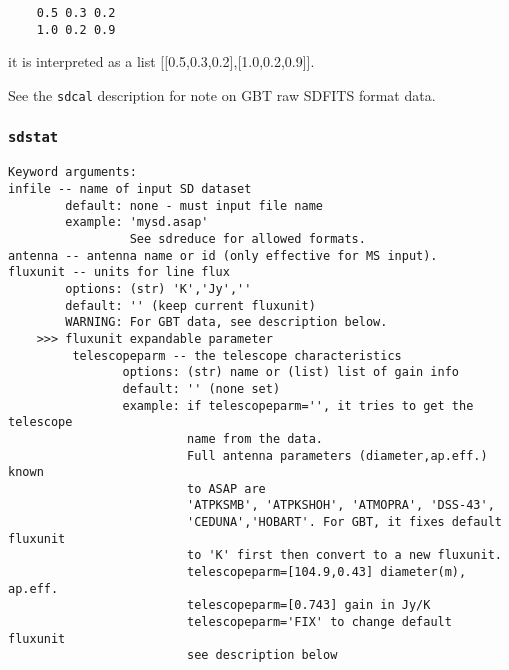 \begin{verbatim}
    0.5 0.3 0.2
    1.0 0.2 0.9
\end{verbatim}

it is interpreted as a list [[0.5,0.3,0.2],[1.0,0.2,0.9]].

See the {\tt sdcal} description for note on GBT raw SDFITS format data.

\subsubsection{{\tt sdstat}}
\label{section:sd.sdtasks.tasks.sdstat}

\begin{verbatim}
Keyword arguments:
infile -- name of input SD dataset
        default: none - must input file name
        example: 'mysd.asap'
                 See sdreduce for allowed formats.
antenna -- antenna name or id (only effective for MS input). 
fluxunit -- units for line flux
        options: (str) 'K','Jy',''
        default: '' (keep current fluxunit)
        WARNING: For GBT data, see description below.
    >>> fluxunit expandable parameter
         telescopeparm -- the telescope characteristics
                options: (str) name or (list) list of gain info
                default: '' (none set)
                example: if telescopeparm='', it tries to get the telescope
                         name from the data.
                         Full antenna parameters (diameter,ap.eff.) known
                         to ASAP are
                         'ATPKSMB', 'ATPKSHOH', 'ATMOPRA', 'DSS-43',
                         'CEDUNA','HOBART'. For GBT, it fixes default fluxunit
                         to 'K' first then convert to a new fluxunit.
                         telescopeparm=[104.9,0.43] diameter(m), ap.eff.
                         telescopeparm=[0.743] gain in Jy/K
                         telescopeparm='FIX' to change default fluxunit
                         see description below


\end{verbatim}
